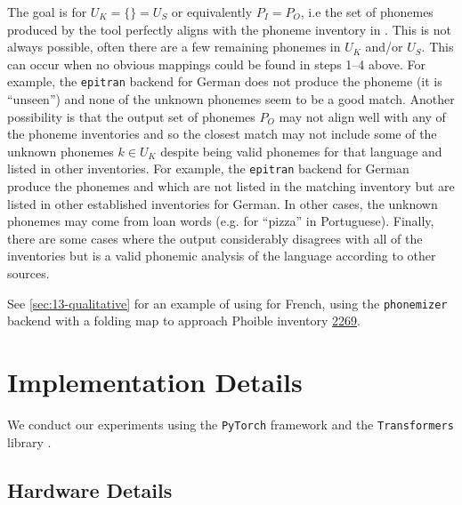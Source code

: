 The goal is for $U_K = \{\} = U_S$ or equivalently $P_I = P_O$, i.e the set of phonemes produced by the tool perfectly aligns with the phoneme inventory in \phoible. This is not always possible, often there are a few remaining phonemes in $U_K$ and/or $U_S$. This can occur when no obvious mappings could be found in steps 1--4 above. For example, the \texttt{epitran} backend for German does not produce the phoneme  (it is ``unseen'') and none of the unknown phonemes seem to be a good match. Another possibility is that the output set of phonemes $P_O$ may not align well with any of the \phoible phoneme inventories and so the closest match may not include some of the unknown phonemes $k \in U_K$ despite being valid phonemes for that language and listed in other inventories. For example, the \texttt{epitran} backend for German produce the phonemes  and  which are not listed in the matching inventory but are listed in other established inventories for German. In other cases, the unknown phonemes may come from loan words (e.g.  for ``pizza'' in Portuguese). Finally, there are some cases where the output considerably disagrees with all of the \phoible inventories but is a valid phonemic analysis of the language according to other sources.

See \cref{sec:13-qualitative} for an example of using \gpp for French, using the \texttt{phonemizer} backend with a folding map to approach Phoible inventory \href{https://phoible.org/inventories/view/2269}{2269}.



\section{Implementation Details}\label{sec:13-models}

We conduct our experiments using the \texttt{PyTorch} framework \citep{paszke-etal-2019-pytorch} and the \texttt{Transformers} library \citep{wolf-etal-2020-transformers}.

\subsection{Hardware Details}


